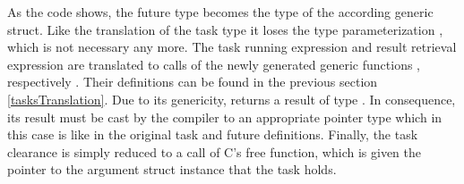 As the code shows, the future type becomes the type of the according generic  struct. Like the translation of the task type it loses the type parameterization , which is not necessary any more. The task running expression  and result retrieval expression  are translated to calls of the newly generated generic functions , respectively . Their definitions can be found in the previous section \ref{tasksTranslation}. Due to its genericity,  returns a result of type . In consequence, its result must be cast by the compiler to an appropriate pointer type which in this case is  like in the original task and future definitions. Finally, the task clearance is simply reduced to a call of C's free function, which is given the pointer to the argument struct instance that the task  holds.